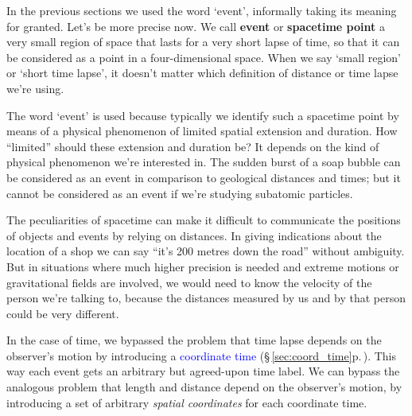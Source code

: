 \documentclass[a4paper,12pt,%
onecolumn,oneside,%
british%
]{memoir}
\renewcommand*{\|}[1][]{\nonscript\:#1\vert\nonscript\:\mathopen{}}
\newcommand*{\sect}{\S}%
\renewcommand*{\autoref}[3][\sect\,\ref]{\textcolor{blue}{#3} {\color{blue}\scriptsize(\faIcon[regular]{eye}\;#1{#2}\;p.\,\pageref{#2})}}
\begin{document}
In the previous sections we used the word \enquote*{event}, informally taking its meaning for granted. Let's be more precise now. We call \textbf{event} or \textbf{spacetime point} a very small region of space that lasts for a very short lapse of time, so  that it can be considered as a point in a four-dimensional space. When we say \enquote*{small region} or \enquote*{short time lapse}, it doesn't matter which definition of distance or time lapse we're using.

The word \enquote*{event} is used because typically we identify such a spacetime point by means of a physical phenomenon of limited spatial extension and duration. How \enquote{limited} should these extension and duration be? It depends on the kind of physical phenomenon we're interested in. The sudden burst of a soap bubble can be considered as an event in comparison to geological distances and times; but it cannot be considered as an event if we're studying subatomic particles.


\medskip

The peculiarities of spacetime can make it difficult to communicate the positions of objects and events by relying on distances. In giving indications about the location of a shop we can say \enquote{it's 200 metres down the road} without ambiguity. But in situations where much higher precision is needed and extreme motions or gravitational fields are involved, we would need to know the velocity of the person we're talking to, because the distances measured by us and by that person could be very different. %


In the case of time, we bypassed the problem that time lapse depends on the observer's motion by introducing a \autoref{sec:coord_time}{coordinate time}. This way each event gets an arbitrary but agreed-upon time label. We can bypass the analogous problem that length and distance depend on the observer's motion, by introducing a set of arbitrary \emph{spatial coordinates} for each coordinate time.
\end{document}
